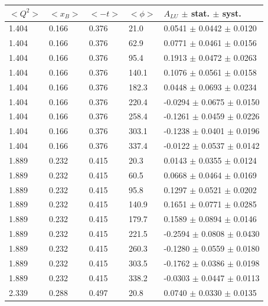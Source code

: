 \documentclass{article}
\begin{document}
\begin{table}[!h]
   \begin{center}
      \begin{tabular}{||l|l|l|l|l||}
         \hline
 $<Q^{2}>$ & $<x_{B}>$ & $<-t>$ & $<\phi>$ & $A_{LU}$ $\pm$ stat. $\pm$ syst.\\
 \hline 
  1.404 & 0.166 & 0.376  &   21.0 &   0.0541 $\pm$  0.0442  $\pm$ 0.0120 \\
  1.404 & 0.166 & 0.376  &   62.9 &   0.0771 $\pm$  0.0461  $\pm$ 0.0156 \\
  1.404 & 0.166 & 0.376  &   95.4 &   0.1913 $\pm$  0.0472  $\pm$ 0.0263 \\
  1.404 & 0.166 & 0.376  &  140.1 &   0.1076 $\pm$  0.0561  $\pm$ 0.0158 \\
  1.404 & 0.166 & 0.376  &  182.3 &   0.0448 $\pm$  0.0693  $\pm$ 0.0234 \\
  1.404 & 0.166 & 0.376  &  220.4 &  -0.0294 $\pm$  0.0675  $\pm$ 0.0150 \\
  1.404 & 0.166 & 0.376  &  258.4 &  -0.1261 $\pm$  0.0459  $\pm$ 0.0226 \\
  1.404 & 0.166 & 0.376  &  303.1 &  -0.1238 $\pm$  0.0401  $\pm$ 0.0196 \\
  1.404 & 0.166 & 0.376  &  337.4 &  -0.0122 $\pm$  0.0537  $\pm$ 0.0142 \\
  \hline                                                              
  1.889 & 0.232 & 0.415  &   20.3 &   0.0143 $\pm$  0.0355  $\pm$ 0.0124 \\
  1.889 & 0.232 & 0.415  &   60.5 &   0.0668 $\pm$  0.0464  $\pm$ 0.0169 \\
  1.889 & 0.232 & 0.415  &   95.8 &   0.1297 $\pm$  0.0521  $\pm$ 0.0202 \\
  1.889 & 0.232 & 0.415  &  140.9 &   0.1651 $\pm$  0.0771  $\pm$ 0.0285 \\
  1.889 & 0.232 & 0.415  &  179.7 &   0.1589 $\pm$  0.0894  $\pm$ 0.0146 \\
  1.889 & 0.232 & 0.415  &  221.5 &  -0.2594 $\pm$  0.0808  $\pm$ 0.0430 \\
  1.889 & 0.232 & 0.415  &  260.3 &  -0.1280 $\pm$  0.0559  $\pm$ 0.0180 \\
  1.889 & 0.232 & 0.415  &  303.5 &  -0.1762 $\pm$  0.0386  $\pm$ 0.0198 \\
  1.889 & 0.232 & 0.415  &  338.2 &  -0.0303 $\pm$  0.0447  $\pm$ 0.0113 \\
  \hline                                                              
  2.339 & 0.288 & 0.497  &  20.8  &  0.0740  $\pm$  0.0330  $\pm$ 0.0135 \\

\end{tabular}
\end{center}
\end{table}
\end{document}
